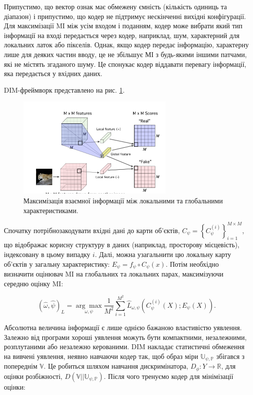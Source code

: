 Припустимо, що вектор ознак має обмежену ємність (кількість одиниць та діапазон) і припустимо, що кодер не підтримує нескінченні вихідні конфігурації. Для максимізації MI між усім входом і поданням, кодер може вибрати який тип інформації на вході передається через кодер, наприклад, шум, характерний для локальних латок або пікселів. Однак, якщо кодер передає інформацію, характерну лише для деяких частин вводу, це не збільшує МІ з будь-якими іншими патчами, які не містять згаданого шуму. Це спонукає кодер віддавати перевагу інформації, яка передається у вхідних даних.

DIM-фреймворк представлено на рис. \ref{fig:deepinfo3}. 

\vspace{1em}

\begin{figure}[h]
  \includegraphics[width=\textwidth, height=5cm, natwidth=291, natheight=188]{Mal/deepinfo3.jpg}
  \caption{Максимізація взаємної інформації між локальними та глобальними характеристиками.}
  \label{fig:deepinfo3}
\end{figure}

Спочатку потрібнозакодувати вхідні дані до карти об’єктів, $C_{\psi} = \left\{ C_{\psi}^{(i)} \right\}_{i=1}^{M \times M}$, що відображає корисну структуру в даних (наприклад, просторову місцевість), індексовану в цьому випадку $i$. Далі, можна узагальнити цю локальну карту об’єктів у загальну характеристику: $E_{\psi} = f_{\psi} \circ C_{\psi}(x)$. Потім необхідно визначити оцінювач MI на глобальних та локальних парах, максимізуючи середню оцінку MI:

\begin{equation}\label{eq:max_mi}
(\hat{\omega}, \hat{\psi})_{L} = \underset{\omega,\psi}{\arg\max}\frac{1}{M^{2}}\sum_{i=1}^{M^{2}}\hat{L}_{\omega, \psi}(C_{\psi}^{(i)}(X); E_{\psi}(X)).
\end{equation}

\vspace{1.5em}

Абсолютна величина інформації є лише однією бажаною властивістю уявлення. Залежно від програми хороші уявлення можуть бути компактними, незалежними, розплутаними або незалежно керованими. DIM накладає статистичні обмеження на вивчені уявлення, неявно навчаючи кодер так, щоб образ міри $\mathbb{U_{\psi, P}}$ збігався з попереднім $\mathbb{V}$. Це робиться шляхом навчання дискримінатора, $D_{\phi} : Y \rightarrow \mathbb{R}$, для оцінки розбіжності, $D(\mathbb{V} || \mathbb{U_{\psi, P}})$. Після чого тренуємо кодер для мінімізації оцінки:

